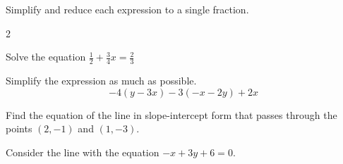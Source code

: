 \documentclass[11pt]{exam}
\begin{document}
\begin{questions}
\question[15] Simplify and reduce each expression to a single fraction.
\begin{multicols}{2}
\addpoints
\end{multicols}
\vspace{3.5in}
\question[15] Solve the equation $\displaystyle \frac{1}{2}+\frac{3}{4}x = \frac{2}{3}$
\vspace{4in}
\addpoints

\question[10] Simplify the expression as much as possible.
\[
- 4(y - 3x) - 3(-x-2y) + 2x
\]
\vspace{3.5in}

\question[15] Find the equation of the line in slope-intercept form that passes through the points $(2,-1)$ and $(1,-3)$.
\vspace{3.5in}

\newpage
\question[20] Consider the line with the equation $-x + 3y + 6=0.$
\noaddpoints
{}
\end{questions}
\end{document}
